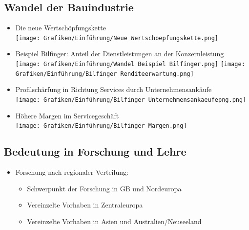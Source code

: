 \documentclass[fleqn,twoside,dvipsnames]{article}
\begin{document}
    \subsection{Wandel der Bauindustrie} \label{Entwicklung Baubranche}
        \begin{itemize}
            \item Die neue Wertschöpfungskette\\
                    \texttt{[image: Grafiken/Einführung/Neue Wertschoepfungskette.png]}
            \item Beispiel Bilfinger: Anteil der Dienstleistungen an der Konzernleistung\\
                    \texttt{[image: Grafiken/Einführung/Wandel Beispiel Bilfinger.png]}
                    \texttt{[image: Grafiken/Einführung/Bilfinger Renditeerwartung.png]}
           \newpage
            \item Profilschärfung in Richtung Services durch Unternehmensankäufe\\
                    \texttt{[image: Grafiken/Einführung/Bilfinger Unternehmensankaeufepng.png]}
            \item Höhere Margen im Servicegeschäft\\
                    \texttt{[image: Grafiken/Einführung/Bilfinger Margen.png]}
        \end{itemize}

    \subsection{Bedeutung in Forschung und Lehre}
        \begin{itemize}
            \item Forschung nach regionaler Verteilung:
                \begin{itemize}
                    \item Schwerpunkt der Forschung in GB und Nordeuropa
                    \item Vereinzelte Vorhaben in Zentraleuropa
                    \item Vereinzelte Vorhaben in Asien und Australien/Neuseeland
                \end{itemize}
        \end{itemize}
\end{document}
